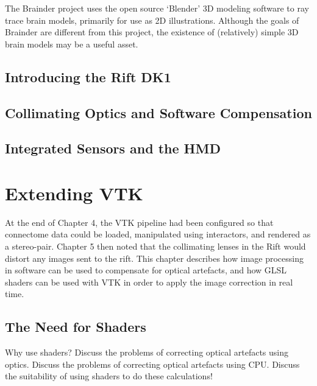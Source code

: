 \documentclass[MSc,paper=a4,pagesize=auto]{icldt}
\begin{document}
The Brainder project uses the open source ‘Blender’ 3D modeling software to ray trace brain models, primarily for use as 2D illustrations. Although the goals of Brainder are different from this project, the existence of (relatively) simple 3D brain models may be a useful asset. 



\section{Introducing the Rift DK1}
\section{Collimating Optics and Software Compensation}
\section{Integrated Sensors and the HMD}

\chapter{Extending VTK}
At the end of Chapter 4, the VTK pipeline had been configured so that connectome data could be loaded, manipulated using interactors, and rendered as a stereo-pair. Chapter 5 then noted that the collimating lenses in the Rift would distort any images sent to the rift. This chapter describes how image processing in software can be used to compensate for optical artefacts, and how GLSL shaders can be used with VTK in order to apply the image correction in real time. 

\section{The Need for Shaders}
Why use shaders?
Discuss the problems of correcting optical artefacts using optics.
Discuss the problems of correcting optical artefacts using CPU. 
Discuss the suitability of using shaders to do these calculations!
\end{document}
